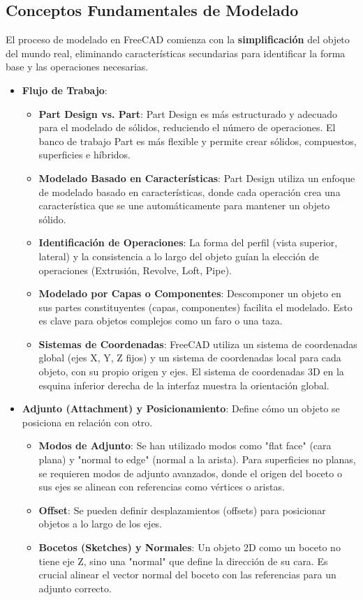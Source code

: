 \documentclass{article}
\begin{document}
\subsection*{Conceptos Fundamentales de Modelado}
El proceso de modelado en FreeCAD comienza con la \textbf{simplificación} del objeto del mundo real, eliminando características secundarias para identificar la forma base y las operaciones necesarias.
\begin{itemize}[noitemsep,topsep=0pt]
    \item \textbf{Flujo de Trabajo}:
    \begin{itemize}[noitemsep,topsep=0pt]
        \item \textbf{Part Design vs. Part}: Part Design es más estructurado y adecuado para el modelado de sólidos, reduciendo el número de operaciones. El banco de trabajo Part es más flexible y permite crear sólidos, compuestos, superficies e híbridos.
        \item \textbf{Modelado Basado en Características}: Part Design utiliza un enfoque de modelado basado en características, donde cada operación crea una característica que se une automáticamente para mantener un objeto sólido.
        \item \textbf{Identificación de Operaciones}: La forma del perfil (vista superior, lateral) y la consistencia a lo largo del objeto guían la elección de operaciones (Extrusión, Revolve, Loft, Pipe).
        \item \textbf{Modelado por Capas o Componentes}: Descomponer un objeto en sus partes constituyentes (capas, componentes) facilita el modelado. Esto es clave para objetos complejos como un faro o una taza.
        \item \textbf{Sistemas de Coordenadas}: FreeCAD utiliza un sistema de coordenadas global (ejes X, Y, Z fijos) y un sistema de coordenadas local para cada objeto, con su propio origen y ejes. El sistema de coordenadas 3D en la esquina inferior derecha de la interfaz muestra la orientación global.
    \end{itemize}
    \item \textbf{Adjunto (Attachment) y Posicionamiento}: Define cómo un objeto se posiciona en relación con otro.
    \begin{itemize}[noitemsep,topsep=0pt]
        \item \textbf{Modos de Adjunto}: Se han utilizado modos como "flat face" (cara plana) y "normal to edge" (normal a la arista). Para superficies no planas, se requieren modos de adjunto avanzados, donde el origen del boceto o sus ejes se alinean con referencias como vértices o aristas.
        \item \textbf{Offset}: Se pueden definir desplazamientos (offsets) para posicionar objetos a lo largo de los ejes.
        \item \textbf{Bocetos (Sketches) y Normales}: Un objeto 2D como un boceto no tiene eje Z, sino una "normal" que define la dirección de su cara. Es crucial alinear el vector normal del boceto con las referencias para un adjunto correcto.
    \end{itemize}
\end{itemize}
\end{document}
